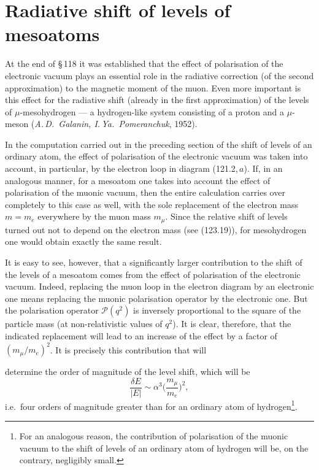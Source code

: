 
\section{Radiative shift of levels of mesoatoms}


At the end of \S\,118 it was established that the effect of polarisation of the electronic vacuum plays an essential role in the radiative correction (of the second approximation) to the magnetic moment of the muon. Even more important is this effect for the radiative shift (already in the first approximation) of the levels of $\mu$-mesohydrogen --- a hydrogen-like system consisting of a proton and a $\mu$-meson (\emph{A.\,D.~Galanin, I.\,Ya.~Pomeranchuk}, 1952).

In the computation carried out in the preceding section of the shift of levels of an ordinary atom, the effect of polarisation of the electronic vacuum was taken into account, in particular, by the electron loop in diagram (121.2,\,$a$). If, in an analogous manner, for a mesoatom one takes into account the effect of polarisation of the muonic vacuum, then the entire calculation carries over completely to this case as well, with the sole replacement of the electron mass $m = m_e$ everywhere by the muon mass $m_\mu$. Since the relative shift of levels turned out not to depend on the electron mass (see (123.19)), for mesohydrogen one would obtain exactly the same result.

It is easy to see, however, that a significantly larger contribution to the shift of the levels of a mesoatom comes from the effect of polarisation of the electronic vacuum. Indeed, replacing the muon loop in the electron diagram by an electronic one means replacing the muonic polarisation operator by the electronic one. But the polarisation operator $\mathcal{P}(q^2)$ is inversely proportional to the square of the particle mass (at non-relativistic values of $q^2$). It is clear, therefore, that the indicated replacement will lead to an increase of the effect by a factor of $(m_\mu/m_e)^2$. It is precisely this contribution that will


\noindent determine the order of magnitude of the level shift, which will be
\[
\frac{\delta E}{|E|} \sim \alpha^3 \biggl(\frac{m_\mu}{m_e}\biggr)^{\!2},
\]
i.e.\ four orders of magnitude greater than for an ordinary atom of hydrogen\footnote{For an analogous reason, the contribution of polarisation of the muonic vacuum to the shift of levels of an ordinary atom of hydrogen will be, on the contrary, negligibly small.}.

